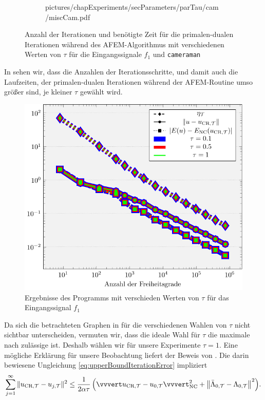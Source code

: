 \begin{figure}[p]
\begin{subfigure}[b]{.48\linewidth}
      {pictures/chapExperiments/secParameters/parTau/cam/miscCam.pdf}
    \label{fig:parTauMiscCam}
  \end{subfigure}
  \caption{Anzahl der Iterationen und benötigte Zeit für die primalen-dualen
    Iterationen während des AFEM-Algorithmus mit verschiedenen Werten von
    $\tau$ für die Eingangssignale $f_1$ und \texttt{cameraman}} 
  \label{fig:parTauMisc}
\end{figure}
In  sehen wir, dass die Anzahlen der Iterationsschritte,
und damit auch die Laufzeiten, der primalen-dualen Iterationen während der
AFEM-Routine umso größer sind, je kleiner $\tau$ gewählt wird.
\begin{figure}[p]
  \centering
  \includegraphics[width=.8\linewidth]
    {pictures/chapExperiments/secParameters/parTau/f01/convergenceF.pdf}
  \caption{Ergebnisse des Programms mit verschieden Werten von $\tau$ für das
    Eingangssignal $f_1$}
  \label{fig:parTauConvergence}
\end{figure}
Da sich die betrachteten Graphen in  für die
verschiedenen Wahlen von $\tau$ nicht sichtbar unterscheiden, vermuten wir,
dass die ideale Wahl für $\tau$ die maximale nach
 zulässige ist.
Deshalb wählen wir für unsere Experimente $\tau=1$.
Eine mögliche Erklärung für unsere Beobachtung liefert der Beweis von
.
Die darin bewiesene Ungleichung \eqref{eq:upperBoundIterationError} impliziert
\begin{align}
  \label{eq:nrIterationsInequality}
  \sum_{j=1}^\infty\Vert \ucrt - \ujt \Vert^2 
  \leq
  \frac{1}{2\alpha\tau}
  \left(\vvvert \ucrt - u_{0,\Tcal}\vvvert^2_\nc 
  + \left\Vert \bar\Lambda_{0,\Tcal} - \Lambda_{0,\Tcal}\right\Vert^2\right)\!. 
\end{align}
